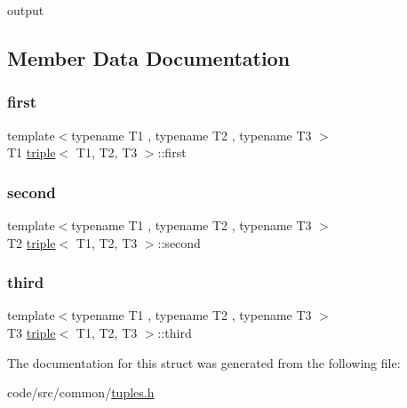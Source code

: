 output 



\subsection{Member Data Documentation}
\mbox{\label{structtriple_a6aa8508e6e6f859dda04f144f361c0d2}} 
\subsubsection{\texorpdfstring{first}{first}}
{\footnotesize\ttfamily template$<$typename T1 , typename T2 , typename T3 $>$ \\
T1 \hyperlink{structtriple}{triple}$<$ T1, T2, T3 $>$\+::first}

\mbox{\label{structtriple_a41050194c8c7984707c7ad13c96e8631}} 
\subsubsection{\texorpdfstring{second}{second}}
{\footnotesize\ttfamily template$<$typename T1 , typename T2 , typename T3 $>$ \\
T2 \hyperlink{structtriple}{triple}$<$ T1, T2, T3 $>$\+::second}

\mbox{\label{structtriple_a5675f08ea7996033edbcf7074404cdd8}} 
\subsubsection{\texorpdfstring{third}{third}}
{\footnotesize\ttfamily template$<$typename T1 , typename T2 , typename T3 $>$ \\
T3 \hyperlink{structtriple}{triple}$<$ T1, T2, T3 $>$\+::third}



The documentation for this struct was generated from the following file\+:\begin{DoxyCompactItemize}
\item 
code/src/common/\hyperlink{tuples_8h}{tuples.\+h}\end{DoxyCompactItemize}
